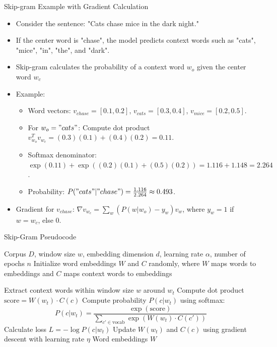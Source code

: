 \documentclass[serif, aspectratio=169]{beamer}
\begin{document}
\begin{frame}{Skip-gram Example with Gradient Calculation}
	\begin{itemize}
		\item Consider the sentence: "Cats chase mice in the dark night."
		\item If the center word is "chase", the model predicts context words such as "cats", "mice", "in", "the", and "dark".
		\item Skip-gram calculates the probability of a context word \(w_o\) given the center word \(w_c\)
		\item Example:
		\begin{itemize}
			\item Word vectors: \(v_{chase} = [0.1, 0.2]\), \(v_{cats} = [0.3, 0.4]\), \(v_{mice} = [0.2, 0.5]\).
			\item For \(w_o = "cats"\): Compute dot product \(v_{w_o}^T v_{w_c} = (0.3)(0.1) + (0.4)(0.2) = 0.11\).
			\item Softmax denominator: \(\exp(0.11) + \exp((0.2)(0.1) + (0.5)(0.2)) = 1.116 + 1.148 = 2.264\).
			\item Probability: \(P("cats" | "chase") = \frac{1.116}{2.264} \approx 0.493\).
		\end{itemize}
		\item Gradient for \(v_{chase}\): \(\nabla v_{w_c} = \sum_{w} \left(P(w | w_o) - y_w\right)v_w\), where \(y_w = 1\) if \(w = w_c\), else 0.
	\end{itemize}
\end{frame}




\begin{frame}{Skip-Gram Pseudocode}
	\begin{algorithm}[H]
		\caption{Skip-Gram Model}
		\begin{algorithmic}
			\fontsize{6pt}{7.2}\selectfont
			\Require Corpus $D$, window size $w$, embedding dimension $d$, learning rate $\alpha$, number of epochs $n$
			\State Initialize word embeddings $W$ and $C$ randomly, where $W$ maps words to embeddings and $C$ maps context words to embeddings
			
			\State Extract context words within window size $w$ around $w_t$
			\State Compute dot product $\text{score} = W(w_t) \cdot C(c)$
			\State Compute probability $P(c|w_t)$ using softmax: 
			\[
			P(c|w_t) = \frac{\exp(\text{score})}{\sum_{c' \in \text{vocab}} \exp(W(w_t) \cdot C(c'))}
			\]
			\State Calculate loss $L = -\log P(c|w_t)$
			\State Update $W(w_t)$ and $C(c)$ using gradient descent with learning rate \(\eta\)
			\EndFor
			\EndFor
			\EndFor
			\EndFor
			\State \Return Word embeddings $W$
		\end{algorithmic}
	\end{algorithm}
\end{frame}
\end{document}
